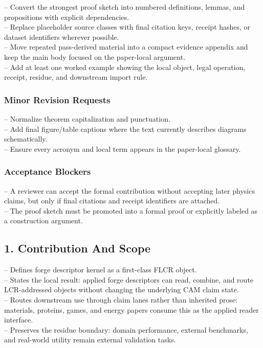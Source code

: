 \documentclass[11pt]{article}
\begin{document}
\noindent{}-- Convert the strongest proof sketch into numbered definitions, lemmas, and propositions with explicit dependencies.\\
\noindent{}-- Replace placeholder source classes with final citation keys, receipt hashes, or dataset identifiers wherever possible.\\
\noindent{}-- Move repeated pass-derived material into a compact evidence appendix and keep the main body focused on the paper-local argument.\\
\noindent{}-- Add at least one worked example showing the local object, legal operation, receipt, residue, and downstream import rule.\\

\subsubsection*{Minor Revision Requests}

\noindent{}-- Normalize theorem capitalization and punctuation.\\
\noindent{}-- Add final figure/table captions where the text currently describes diagrams schematically.\\
\noindent{}-- Ensure every acronym and local term appears in the paper-local glossary.\\

\subsubsection*{Acceptance Blockers}

\noindent{}-- A reviewer can accept the formal contribution without accepting later physics claims, but only if final citations and receipt identifiers are attached.\\
\noindent{}-- The proof sketch must be promoted into a formal proof or explicitly labeled as a construction argument.\\


\subsection*{1. Contribution And Scope}

\noindent{}-- Defines forge descriptor kernel as a first-class FLCR object.\\
\noindent{}-- States the local result: applied forge descriptors can read, combine, and route LCR-addressed objects without changing the underlying CAM claim state.\\
\noindent{}-- Routes downstream use through claim lanes rather than inherited prose: materials, proteins, games, and energy papers consume this as the applied reader interface.\\
\noindent{}-- Preserves the residue boundary: domain performance, external benchmarks, and real-world utility remain external validation tasks.\\
\end{document}
